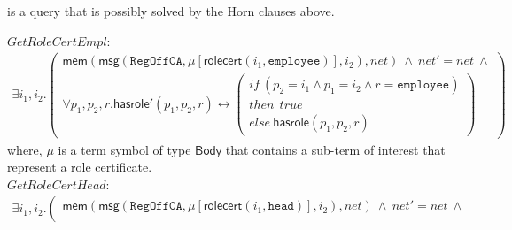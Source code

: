 \documentclass[conference]{IEEEtran}
\begin{document}
\begin{LONG}
\noindent
is a query that is possibly solved by the Horn clauses above.


\begin{figure*}[t]
$\mathit{GetRoleCertEmpl}$:
 \begin{eqnarray*}
    \exists i_1, i_2. 
     \left(
       \begin{array}{l}
         \mathsf{mem}(\mathsf{msg}(\mathtt{RegOffCA}, \mu[\mathsf{rolecert}(i_1, \mathtt{employee})], i_2), \mathit{net})
         ~\wedge \
         \mathit{net}' = \mathit{net} ~ \wedge \\
         
         \forall p_1,p_2,r.
           \mathsf{hasrole}'(p_1,p_2,r) \leftrightarrow 
           \left(
             \begin{array}{l}
               \mathit{if}~ (p_2=i_1 \wedge p_1=i_2 \wedge r=\mathtt{employee}) \\
               \mathit{then ~~ true} \\
               \mathit{else} ~ \mathsf{hasrole}(p_1,p_2,r) 
             \end{array} 
           \right)
         \end{array}
       \right)
  \end{eqnarray*}
where, $\mu$ is a term symbol of type $\mathsf{Body}$ that contains a sub-term of interest that represent a role certificate.\\
\noindent
$\mathit{GetRoleCertHead}$:
 \begin{eqnarray*}
    \exists i_1, i_2. 
     \left(
       \begin{array}{l}
         \mathsf{mem}(\mathsf{msg}(\mathtt{RegOffCA}, \mu[\mathsf{rolecert}(i_1, \mathtt{head})], i_2), \mathit{net})
         ~\wedge \
         \mathit{net}' = \mathit{net} ~ \wedge \\
         

\end{array}
\end{eqnarray*}
\end{figure*}
\end{LONG}
\end{document}
